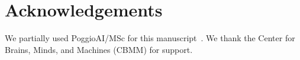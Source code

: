 \section*{Acknowledgements}

We partially used PoggioAI/MSc for this manuscript~\citep{PoggioAIMSc_2026}.
We thank the Center for Brains, Minds, and Machines (CBMM) for support.
